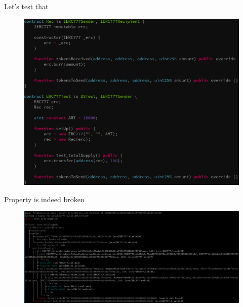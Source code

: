\documentclass[aspectratio=169,10pt]{beamer}
\begin{document}
\begin{frame}[fragile]
\begin{center}
Let's test that
\begin{figure}
	\includegraphics[scale=0.25]{images/erc777_fail_hevm_test_code}
\end{figure}
\end{center}
\end{frame}

\begin{frame}[fragile]
\begin{center}
Property is indeed broken
\begin{figure}
	\includegraphics[scale=0.2]{images/erc777_fail_hevm_test}
\end{figure}
\end{center}
\end{frame}
\end{document}

